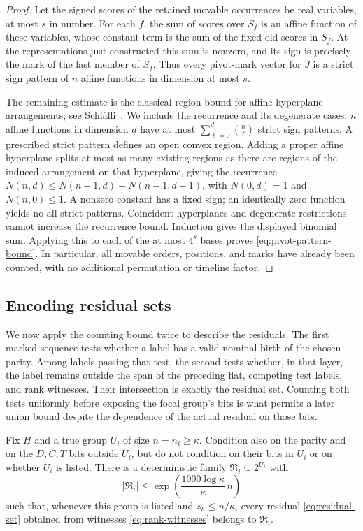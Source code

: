 \begin{proof}
Let the signed scores of the retained movable occurrences be real
variables, at most $s$ in number.  For each $f$, the sum of scores over
$S_f$ is an affine function of these variables, whose constant term is
the sum of the fixed old scores in $S_f$.  At the representations just
constructed this sum is nonzero, and its sign is precisely the mark of
the last member of $S_f$.  Thus every pivot-mark vector for $J$ is a
strict sign pattern of $n$ affine functions in dimension at most $s$.

The remaining estimate is the classical region bound for affine
hyperplane arrangements; see Schl\"afli~\cite[Section 16, pp.~39--40]{Schlafli1901}.
We include the recurrence and its degenerate cases: $n$ affine functions
in dimension $d$ have at most
$\sum_{\ell=0}^{d}\binom n\ell$ strict sign patterns.  A prescribed
strict pattern defines an open convex region.  Adding a proper affine
hyperplane splits at most as many existing regions as there are regions
of the induced arrangement on that hyperplane, giving the recurrence
$N(n,d)\le N(n-1,d)+N(n-1,d-1)$, with
$N(0,d)=1$ and $N(n,0)\le1$.  A nonzero constant has a fixed sign; an
identically zero function yields no all-strict patterns.  Coincident
hyperplanes and degenerate restrictions cannot increase the recurrence
bound.  Induction gives the displayed binomial sum.  Applying this to
each of the at most $4^s$ bases proves \eqref{eq:pivot-pattern-bound}.
In particular, all movable orders, positions, and marks have already
been counted, with no additional permutation or timeline factor.
\end{proof}

\subsection{Encoding residual sets}

We now apply the counting bound twice to describe the residuals. The
first marked sequence tests whether a label has a valid nominal birth
of the chosen parity. Among labels passing that test, the second tests
whether, in that layer, the label remains
outside the span of the preceding flat, competing test labels, and rank
witnesses. Their intersection is exactly the residual set. Counting both
tests uniformly before exposing the focal group's bits is what permits
a later union bound despite the dependence of the actual residual on
those bits.

\begin{lemma}\label{lem:pattern-family}
Fix $H$ and a true group $U_i$ of size $n=n_i\ge\kappa$.
Condition also on the parity and on the $D,C,T$ bits outside $U_i$,
but do not condition on their bits in $U_i$ or on whether $U_i$ is
listed.
There is a deterministic family $\mathfrak R_i\subseteq 2^{U_i}$ with
\begin{equation}\label{eq:pattern-family-size}
 |\mathfrak R_i|\le
 \exp\left(\frac{1000\log\kappa}{\kappa}\,n\right)
\end{equation}
such that, whenever this group is listed and $z_h\le n/\kappa$, every
residual \eqref{eq:residual-set} obtained from witnesses
\eqref{eq:rank-witnesses} belongs to $\mathfrak R_i$.
\end{lemma}

